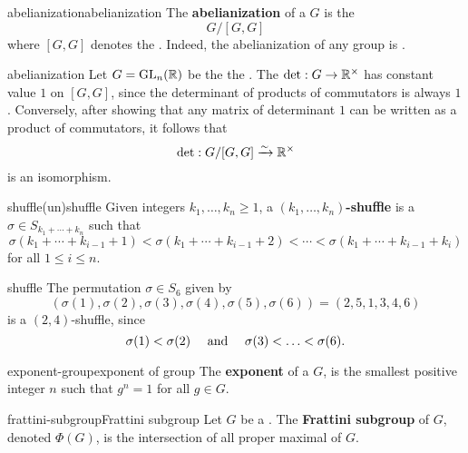 \begin{topic}{abelianization}{abelianization}
    The \textbf{abelianization} of a  $G$ is the 
    \[ G/[G, G] \]
    where $[G, G]$ denotes the . Indeed, the abelianization of any group is .
\end{topic}

\begin{example}{abelianization}
    Let $G = \textup{GL}_n(\mathbb{R})$ be the the . The  $\det : G \to \mathbb{R}^\times$ has constant value $1$ on $[G, G]$, since the determinant of products of commutators is always $1$. Conversely, after showing that any matrix of determinant $1$ can be written as a product of commutators, it follows that
    \[ \det : G / [G, G] \xrightarrow{\sim} \mathbb{R}^\times \]
    is an isomorphism.
\end{example}

\begin{topic}{shuffle}{(un)shuffle}
    Given integers $k_1, \ldots, k_n \ge 1$, a \textbf{$(k_1, \ldots, k_n)$-shuffle} is a  $\sigma \in S_{k_1 + \cdots + k_n}$ such that
    \[ \sigma(k_1 + \cdots + k_{i - 1} + 1) < \sigma(k_1 + \cdots + k_{i - 1} + 2) < \cdots < \sigma(k_1 + \cdots + k_{i - 1} + k_i) \]
    for all $1 \le i \le n$.
\end{topic}

\begin{example}{shuffle}
    The permutation $\sigma \in S_6$ given by
    \[ (\sigma(1), \sigma(2), \sigma(3), \sigma(4), \sigma(5), \sigma(6)) = (2, 5, 1, 3, 4, 6) \]
    is a $(2, 4)$-shuffle, since
    \[ \sigma(1) < \sigma(2) \quad \textup{ and } \quad \sigma(3) < \ldots < \sigma(6) . \]
\end{example}

\begin{topic}{exponent-group}{exponent of group}
    The \textbf{exponent} of a  $G$, is the smallest positive integer $n$ such that $g^n = 1$ for all $g \in G$.
\end{topic}

\begin{topic}{frattini-subgroup}{Frattini subgroup}
    Let $G$ be a . The \textbf{Frattini subgroup} of $G$, denoted $\Phi(G)$, is the intersection of all proper maximal  of $G$.
\end{topic}

